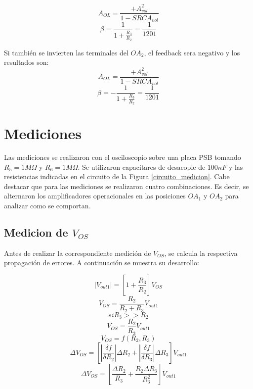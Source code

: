 \begin{displaymath}  A_{OL}= \frac{+A_{vol}^2}{1-SRC A_{vol}}  \end{displaymath}
\begin{displaymath}  \beta =  \frac{1}{1+ \frac{R_3}{R_2}} = \frac{1}{1201}  \end{displaymath}

Si también se invierten las terminales del $OA_2$, el feedback sera negativo y los resultados son:
\begin{displaymath}  A_{OL}= \frac{+A_{vol}^2}{1-SRC A_{vol}}  \end{displaymath}
\begin{displaymath}  \beta =  -\frac{1}{1+ \frac{R_3}{R_2}} = \frac{1}{1201}  \end{displaymath}

\section{Mediciones}
Las mediciones se realizaron con el osciloscopio sobre una placa PSB tomando $R_5 = 1M\Omega$ y $R_6 = 1M\Omega$. Se utilizaron capacitares de desacople de $100nF$ y las resistencias indicadas en el circuito de la Figura \ref{circuito_medicion}.
Cabe destacar que para las mediciones se realizaron cuatro combinaciones. Es decir, se alternaron los amplificadores operacionales en las posiciones $OA_1$ y $OA_2$ para analizar como se comportan. 


\subsection{Medicion de $V_{OS}$}

Antes de realizar la correspondiente medición de $V_{OS}$, se calcula la respectiva propagación de errores.  A continuación se muestra su desarrollo:

\begin{displaymath} |V_{out1}| = [1 + \frac{R_3}{R_2}]V_{OS} \end{displaymath}
\begin{displaymath} V_{OS} = \frac{R_2}{R_2 + R_3} V_{out1} \end{displaymath}
\begin{displaymath} si R_3 >> R_2 \end{displaymath}  
\begin{displaymath} V_{OS} = \frac{R_2}{R_3} V_{out1} \end{displaymath} 
\begin{displaymath} V_{OS} = f(R_2,R_3) \end{displaymath} 
\begin{displaymath} \Delta V_{OS} = [|\frac{\delta f}{\delta R_2}| \Delta R_2 + |\frac{\delta f}{\delta R_3}| \Delta R_3 ] V_{out1} \end{displaymath} 
\begin{displaymath} \Delta V_{OS} = [\frac {\Delta R_2} { R_3} + \frac{R_2 \Delta R_3 }{R_3^2}] V_{out1} \end{displaymath} 

